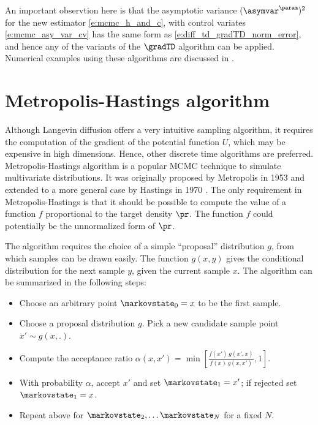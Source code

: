An important observtion here is that the asymptotic variance $(\asymvar^\param)^2$ for the new estimator \eqref{e:mcmc_h_and_c}, with control variates \eqref{e:mcmc_asy_var_cv} has the same form as \eqref{e:diff_td_gradTD_norm_error}, and hence any of the variants of the $\gradTD$ algorithm can be applied. Numerical examples using these algorithms are discussed in .

\section{Metropolis-Hastings algorithm}
\label{s:mcmc_metropolis}
Although Langevin diffusion offers a very intuitive sampling algorithm, it requires the computation of the gradient of the potential function $U$, which may be expensive in high dimensions. Hence, other discrete time algorithms are preferred. Metropolis-Hastings algorithm is a popular MCMC technique to simulate multivariate distributions. It was originally proposed by Metropolis in 1953 and extended to a more general case by Hastings in 1970 \cite{has70}. The only requirement in Metropolis-Hastings is that it should be possible to compute the value of a function $f$ proportional to the target density $\pr$. The function $f$ could potentially be the unnormalized form of $\pr$.

The algorithm requires the choice of a simple ``proposal'' distribution $g$, from which samples can be drawn easily. The function $g(x,y)$ gives the conditional distribution for the next sample $y$, given the current sample $x$.  The algorithm can be summarized in the following steps:

\begin{itemize}
	\item Choose an arbitrary point $\markovstate_0 = x$ to be the first sample.
	\item Choose a proposal distribution $g$. Pick a new candidate sample point $x' \sim g (x,.) $.
	\item Compute the acceptance ratio $\alpha(x,x')= \min \left[ \frac{f(x') \, g (x',x)}{f(x) \, g(x,x')}, 1\right] $.
	\item With probability $\alpha$, accept $x'$ and set $\markovstate_1 = x'$; if rejected set $\markovstate_1 = x$.
	\item Repeat above for $ \markovstate_2, \hdots \markovstate_N$ for a fixed $N$.
\end{itemize}

